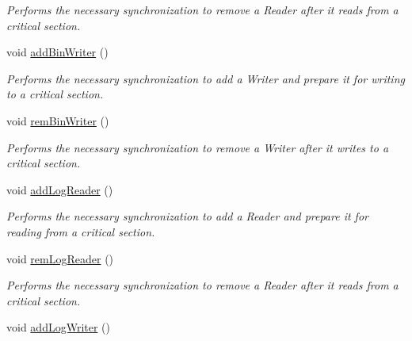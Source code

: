 \begin{DoxyCompactItemize}
\begin{DoxyCompactList}\small\item\em Performs the necessary synchronization to remove a Reader after it reads from a critical section. \end{DoxyCompactList}\item 
\hypertarget{classLogBinRWSemMonitor_a10eb8513d3acc3005b9b8509a99a8422}{void \hyperlink{classLogBinRWSemMonitor_a10eb8513d3acc3005b9b8509a99a8422}{add\-Bin\-Writer} ()}\label{classLogBinRWSemMonitor_a10eb8513d3acc3005b9b8509a99a8422}

\begin{DoxyCompactList}\small\item\em Performs the necessary synchronization to add a Writer and prepare it for writing to a critical section. \end{DoxyCompactList}\item 
\hypertarget{classLogBinRWSemMonitor_afd9f3b200a4f35869eef82f6f8ba0ed7}{void \hyperlink{classLogBinRWSemMonitor_afd9f3b200a4f35869eef82f6f8ba0ed7}{rem\-Bin\-Writer} ()}\label{classLogBinRWSemMonitor_afd9f3b200a4f35869eef82f6f8ba0ed7}

\begin{DoxyCompactList}\small\item\em Performs the necessary synchronization to remove a Writer after it writes to a critical section. \end{DoxyCompactList}\item 
\hypertarget{classLogBinRWSemMonitor_a6a2706cf52a6fcf131825f89583d9b08}{void \hyperlink{classLogBinRWSemMonitor_a6a2706cf52a6fcf131825f89583d9b08}{add\-Log\-Reader} ()}\label{classLogBinRWSemMonitor_a6a2706cf52a6fcf131825f89583d9b08}

\begin{DoxyCompactList}\small\item\em Performs the necessary synchronization to add a Reader and prepare it for reading from a critical section. \end{DoxyCompactList}\item 
\hypertarget{classLogBinRWSemMonitor_ae11f2d074e2cef3f883516e5de66ceec}{void \hyperlink{classLogBinRWSemMonitor_ae11f2d074e2cef3f883516e5de66ceec}{rem\-Log\-Reader} ()}\label{classLogBinRWSemMonitor_ae11f2d074e2cef3f883516e5de66ceec}

\begin{DoxyCompactList}\small\item\em Performs the necessary synchronization to remove a Reader after it reads from a critical section. \end{DoxyCompactList}\item 
\hypertarget{classLogBinRWSemMonitor_a45ca21fec4650cbed907f191e2ff7f56}{void \hyperlink{classLogBinRWSemMonitor_a45ca21fec4650cbed907f191e2ff7f56}{add\-Log\-Writer} ()}\label{classLogBinRWSemMonitor_a45ca21fec4650cbed907f191e2ff7f56}


\end{DoxyCompactItemize}
